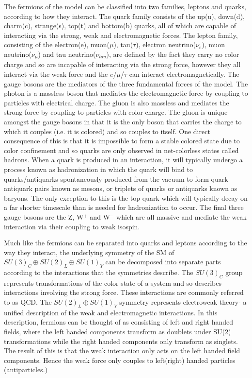 The fermions of the model can be classified into two families, leptons and quarks, according to how they interact. The quark family consists of the up(u), down(d), charm(c), strange(s), top(t) and bottom(b) quarks, all of which are capable of interacting via the strong, weak and electromagnetic forces. The lepton family, consisting of the electron(e), muon($\mu$), tau($\tau$), electron neutrino($\nu_{e}$), muon neutrino($\nu_{\mu}$) and tau neutrino($\nu_{tau}$), are defined by the fact they carry no color charge and so are incapable of interacting via the strong force, however they all interact via the weak force and the $e$/$\mu$/$\tau$ can interact electromagnetically. The gauge bosons are the mediators of the three fundamental forces of the model. The photon is a massless boson that mediates the electromagnetic force by coupling to particles with electrical charge. The gluon is also massless and mediates the strong force by coupling to particles with color charge. The gluon is unique amongst the gauge bosons in that it is the only boson that carries the charge to which it couples (i.e. it is colored) and so couples to itself. One direct consequence of this is that it is impossible to form a stable colored state due to color confinement and so quarks are only observed in net-colorless states called hadrons. When a quark is produced in an interaction, it will typically undergo a process known as hadronization in which the quark will bind to quarks/antiquarks spontaneously produced from the vacuum to form quark-antiquark pairs known as mesons, or triplets of quarks or antiquarks known as baryons. The only exception to this is the top quark which will typically decay on a far shorter timescale than is needed for hadronization to occur. The final three gauge bosons are the Z, W$^+$ and W$^-$ which are all massive and mediate the weak interaction via their coupling to weak isospin.

Much like the fermions can be separated into quarks and leptons according to the way they interact, the underlying symmetry of the \ac{SM} of $SU(3)_{C}\oplus SU(2)_{L}\oplus SU(1)_{Y}$ can be decomposed into separate parts according to the interactions that the symmetries describe. The $SU(3)_{C}$ group represents transformations of the color state of a system and so describes interactions involving the strong force. These interactions are commonly referred to as \ac{QCD}. The $SU(2)_{L}\oplus SU(1)_{Y}$ symmetry represents electroweak theory- a unified description of the weak and electromagnetic interactions. In this description, fermions can be thought of as consisting of left and right handed fields, where the left handed components transform as doublets under SU(2) transformations while the right handed components only transform as singlets. The result of this is that the weak interaction only acts on the left handed field components. Hence the weak force only couples to left(right) handed particles (antiparticles.) 

